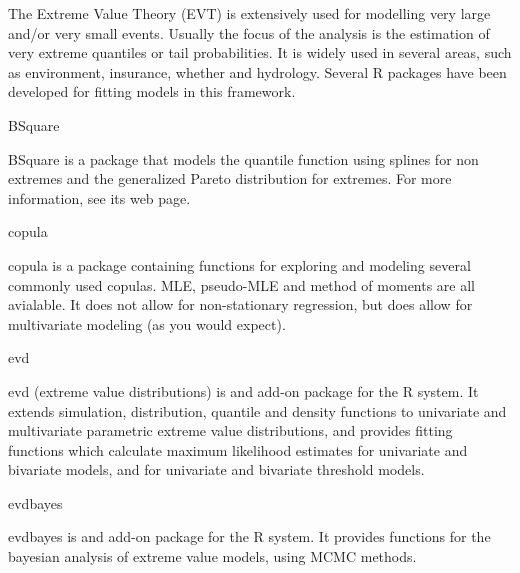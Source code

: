 \begin{frame}
The Extreme Value Theory (EVT) is extensively used for modelling very large and/or very small events. 
Usually the focus of the analysis is the estimation of very extreme quantiles or tail probabilities. 
It is widely used in several areas, such as environment, insurance, whether and hydrology. 
Several R packages have been developed for fitting models in this framework. 
\end{frame}
\begin{frame}
BSquare

BSquare is a package that models the quantile function using splines for non extremes and the generalized Pareto distribution for extremes. For more information, see its web page.

copula

copula is a package containing functions for exploring and modeling several commonly used copulas. MLE, pseudo-MLE and method of moments are all avialable. It does not allow for non-stationary regression, but does allow for multivariate modeling (as you would expect).

evd

evd (extreme value distributions) is and add-on package for the R system. It extends simulation, distribution, quantile and density functions to univariate and multivariate parametric extreme value distributions, and provides fitting functions which calculate maximum likelihood estimates for univariate and bivariate models, and for univariate and bivariate threshold models.

evdbayes

evdbayes is and add-on package for the R system. It provides functions for the bayesian analysis of extreme value models, using MCMC methods.
\end{frame}
